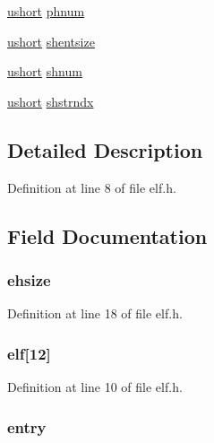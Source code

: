 \begin{DoxyCompactItemize}
\hyperlink{types_8h_ab95f123a6c9bcfee6a343170ef8c5f69}{ushort} \hyperlink{structelfhdr_ab01d40cd4ae38ce7b110d34cc0310a6b}{phnum}
\item 
\hyperlink{types_8h_ab95f123a6c9bcfee6a343170ef8c5f69}{ushort} \hyperlink{structelfhdr_af9b275643c2083bb195d46bd28e5160f}{shentsize}
\item 
\hyperlink{types_8h_ab95f123a6c9bcfee6a343170ef8c5f69}{ushort} \hyperlink{structelfhdr_a56c0f0300ab098f73d32e42ad4d7c31e}{shnum}
\item 
\hyperlink{types_8h_ab95f123a6c9bcfee6a343170ef8c5f69}{ushort} \hyperlink{structelfhdr_a8cab050781091046b4cd1369c5988d48}{shstrndx}
\end{DoxyCompactItemize}


\subsection{Detailed Description}


Definition at line 8 of file elf.\-h.



\subsection{Field Documentation}
\hypertarget{structelfhdr_a671e08b578c02e1ab047c50ccb3abf84}{
\subsubsection[{ehsize}]{ ehsize}}\label{structelfhdr_a671e08b578c02e1ab047c50ccb3abf84}


Definition at line 18 of file elf.\-h.

\hypertarget{structelfhdr_aeba513355af321c78221dd668b203ab4}{
\subsubsection[{elf}]{ elf\mbox{[}12\mbox{]}}}\label{structelfhdr_aeba513355af321c78221dd668b203ab4}


Definition at line 10 of file elf.\-h.

\hypertarget{structelfhdr_a7fab9dad7727f5820bcce43d7649c872}{
\subsubsection[{entry}]{ entry}}\label{structelfhdr_a7fab9dad7727f5820bcce43d7649c872}



